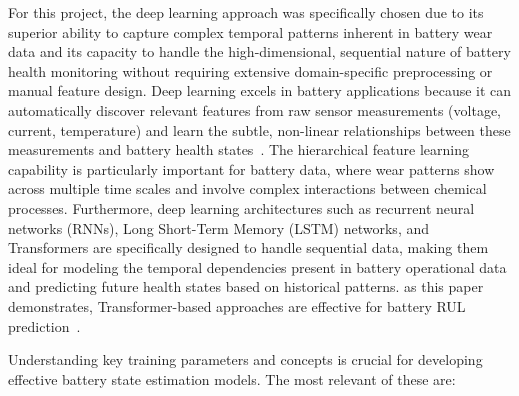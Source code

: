 For this project, the deep learning approach was specifically chosen due to its superior ability to capture complex temporal patterns inherent in battery wear data and its capacity to handle the high-dimensional, sequential nature of battery health monitoring without requiring extensive domain-specific preprocessing or manual feature design. Deep learning excels in battery applications because it can automatically discover relevant features from raw sensor measurements (voltage, current, temperature) and learn the subtle, non-linear relationships between these measurements and battery health states~\cite{noauthor_comprehensive_nodate}. The hierarchical feature learning capability is particularly important for battery data, where wear patterns show across multiple time scales and involve complex interactions between chemical processes. Furthermore, deep learning architectures such as recurrent neural networks (RNNs), Long Short-Term Memory (LSTM) networks, and Transformers are specifically designed to handle sequential data, making them ideal for modeling the temporal dependencies present in battery operational data and predicting future health states based on historical patterns. as this paper demonstrates, Transformer-based approaches are effective for battery RUL prediction~\cite{chen_transformer_2022}.


Understanding key training parameters and concepts is crucial for developing effective battery state estimation models. The most relevant of these are:

